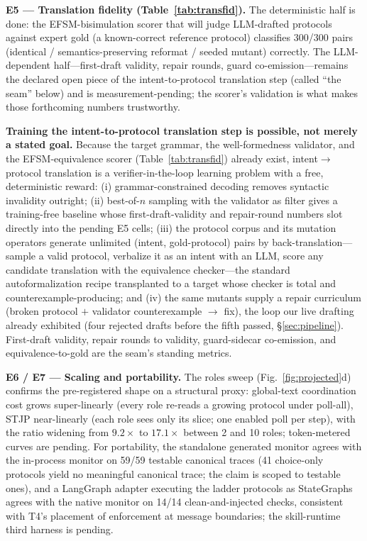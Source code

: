 \documentclass{article}
\newcommand{\stjp}{\textsc{STJP}}
\begin{document}
\textbf{E5 --- Translation fidelity (Table~\ref{tab:transfid}).} The deterministic half is done: the EFSM-bisimulation scorer that will judge LLM-drafted protocols against expert gold (a known-correct reference protocol) classifies 300/300 pairs (identical / semantics-preserving reformat / seeded mutant) correctly. The LLM-dependent half---first-draft validity, repair rounds, guard co-emission---remains the declared open piece of the intent-to-protocol translation step (called ``the seam'' below) and is measurement-pending; the scorer's validation is what makes those forthcoming numbers trustworthy.

\textbf{Training the intent-to-protocol translation step is possible, not merely a stated goal.} Because the target grammar, the well-formedness validator, and the EFSM-equivalence scorer (Table~\ref{tab:transfid}) already exist, intent$\to$protocol translation is a verifier-in-the-loop learning problem with a free, deterministic reward: (i) grammar-constrained decoding removes syntactic invalidity outright; (ii) best-of-$n$ sampling with the validator as filter gives a training-free baseline whose first-draft-validity and repair-round numbers slot directly into the pending E5 cells; (iii) the protocol corpus and its mutation operators generate unlimited (intent, gold-protocol) pairs by back-translation---sample a valid protocol, verbalize it as an intent with an LLM, score any candidate translation with the equivalence checker---the standard autoformalization recipe \citep{nl2spec,prosper} transplanted to a target whose checker is total and counterexample-producing; and (iv) the same mutants supply a repair curriculum (broken protocol $+$ validator counterexample $\to$ fix), the loop our live drafting already exhibited (four rejected drafts before the fifth passed, \S\ref{sec:pipeline}). First-draft validity, repair rounds to validity, guard-sidecar co-emission, and equivalence-to-gold are the seam's standing metrics.

\textbf{E6 / E7 --- Scaling and portability.} The roles sweep (Fig.~\ref{fig:projected}d) confirms the pre-registered shape on a structural proxy: global-text coordination cost grows super-linearly (every role re-reads a growing protocol under poll-all), \stjp{} near-linearly (each role sees only its slice; one enabled poll per step), with the ratio widening from $9.2\times$ to $17.1\times$ between 2 and 10 roles; token-metered curves are pending. For portability, the standalone generated monitor agrees with the in-process monitor on 59/59 testable canonical traces (41 choice-only protocols yield no meaningful canonical trace; the claim is scoped to testable ones), and a LangGraph adapter executing the ladder protocols as StateGraphs agrees with the native monitor on 14/14 clean-and-injected checks, consistent with T4's placement of enforcement at message boundaries; the skill-runtime third harness is pending.
\end{document}
